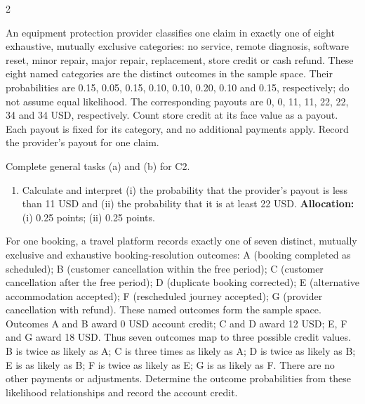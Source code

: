 \begin{multicols*}{2}
\noindent\begin{minipage}{\linewidth}
An equipment protection provider classifies one claim in exactly one of eight exhaustive, mutually exclusive categories: no service, remote diagnosis, software reset, minor repair, major repair, replacement, store credit or cash refund. These eight named categories are the distinct outcomes in the sample space. Their probabilities are 0.15, 0.05, 0.15, 0.10, 0.10, 0.20, 0.10 and 0.15, respectively; do not assume equal likelihood. The corresponding payouts are 0, 0, 11, 11, 22, 22, 34 and 34 USD, respectively. Count store credit at its face value as a payout. Each payout is fixed for its category, and no additional payments apply. Record the provider's payout for one claim.

Complete general tasks (a)  and (b)  for C2.
\begin{enumerate}[label=(\alph*),start=3]
\item {} Calculate and interpret (i) the probability that the provider's payout is less than 11 USD and (ii) the probability that it is at least 22 USD.
\textbf{Allocation:} (i) 0.25 points; (ii) 0.25 points.
\end{enumerate}
\end{minipage}\par\medskip

\noindent\begin{minipage}{\linewidth}
For one booking, a travel platform records exactly one of seven distinct, mutually exclusive and exhaustive booking-resolution outcomes: A (booking completed as scheduled); B (customer cancellation within the free period); C (customer cancellation after the free period); D (duplicate booking corrected); E (alternative accommodation accepted); F (rescheduled journey accepted); G (provider cancellation with refund). These named outcomes form the sample space. Outcomes A and B award 0 USD account credit; C and D award 12 USD; E, F and G award 18 USD. Thus seven outcomes map to three possible credit values. B is twice as likely as A; C is three times as likely as A; D is twice as likely as B; E is as likely as B; F is twice as likely as E; G is as likely as F. There are no other payments or adjustments. Determine the outcome probabilities from these likelihood relationships and record the account credit.


\end{minipage}
\end{multicols*}
